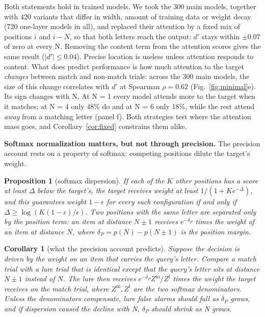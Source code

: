 \documentclass{article}
\newtheorem{proposition}{Proposition}
\newtheorem{corollary}{Corollary}
\newcommand{\dprime}{$d'$}
\begin{document}
Both statements hold in trained models. We took the 300 main models, together with 420 variants that differ in width, amount of training data or weight decay (720 one-layer models in all), and replaced their attention by a fixed mix of positions $i$ and $i-N$, so that both letters reach the output: \dprime{} stays within $\pm0.07$ of zero at every N. Removing the content term from the attention scores gives the same result ($|d'|\le0.04$). Precise location is useless unless attention responds to content. What does predict performance is how much attention to the target \emph{changes} between match and non-match trials: across the 300 main models, the size of this change correlates with \dprime{} at Spearman $\rho=0.62$ (Fig.~\ref{fig:minimal}e). Its sign changes with N. At N = 1 every model attends more to the target when it matches; at N = 4 only 48\% do and at N = 6 only 18\%, while the rest attend \emph{away} from a matching letter (panel f). Both strategies test where the attention mass goes, and Corollary~\ref{cor:fixed} constrains them alike.

\textbf{Softmax normalization matters, but not through precision.} The precision account rests on a property of softmax: competing positions dilute the target's weight.

\begin{proposition}[softmax dispersion]\label{prop:dispersion}
If each of the $K$ other positions has a score at least $\Delta$ below the target's, the target receives weight at least $1/(1+Ke^{-\Delta})$, and this guarantees weight $1-\epsilon$ for every such configuration if and only if $\Delta\ge\log(K(1-\epsilon)/\epsilon)$. Two positions with the same letter are separated only by the position term: an item at distance $N\pm1$ receives $e^{-\delta_P}$ times the weight of an item at distance $N$, where $\delta_P=p(N)-p(N\pm1)$ is the \emph{position margin}.
\end{proposition}

\begin{corollary}[what the precision account predicts]\label{cor:lure}
Suppose the decision is driven by the weight on an item that carries the query's letter. Compare a match trial with a lure trial that is identical except that the query's letter sits at distance $N\pm1$ instead of $N$. The lure then receives $e^{-\delta_P}Z^{\text{m}}/Z^{\text{l}}$ times the weight the target receives on the match trial, where $Z^{\text{m}},Z^{\text{l}}$ are the two softmax denominators. Unless the denominators compensate, lure false alarms should fall as $\delta_P$ grows, and if dispersion caused the decline with N, $\delta_P$ should shrink as N grows.
\end{corollary}
\end{document}
